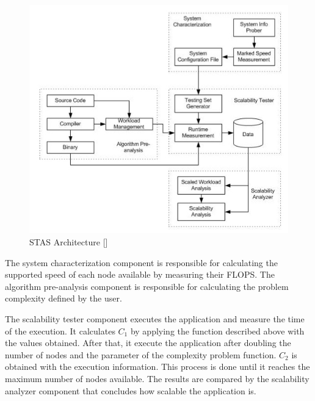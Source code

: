 \begin{figure}[htbp]
\begin{center}
	\includegraphics[scale=0.6]{images/stasarchitecture}
\caption{STAS Architecture [\cite{STAS}]}
\label{stasarchitecture}
\end{center}
\end{figure}

The system characterization component is responsible for calculating the supported speed of each node available by measuring their FLOPS. The algorithm pre-analysis component is responsible for calculating the problem complexity defined by the user. 

The scalability tester component executes the application and measure the time of the execution.  It calculates $C_1$ by applying the function described above with the values obtained. After that, it execute the application after doubling the number of nodes and the parameter of the complexity problem function. $C_2$ is obtained with the execution information. This process is done until it reaches the maximum number of nodes available. The results are compared by the scalability analyzer component that concludes how scalable the application is.










